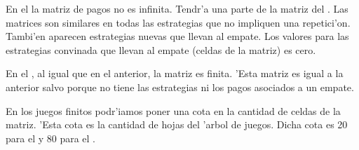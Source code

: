 En el  la matriz de pagos no es infinita. Tendr'a una parte de la matriz del . Las matrices son similares en todas las estrategias que no impliquen una repetici'on. Tambi'en aparecen estrategias nuevas que llevan al empate. Los valores para las estrategias convinada que llevan al empate (celdas de la matriz) es cero.

En el , al igual que en el anterior, la matriz es finita. 'Esta matriz es igual a la anterior salvo porque no tiene las estrategias ni los pagos asociados a un empate.

En los juegos finitos podr'iamos poner una cota en la cantidad de celdas de la matriz. 'Esta cota es la cantidad de hojas del 'arbol de juegos. Dicha cota es 20 para el  y 80 para el .




